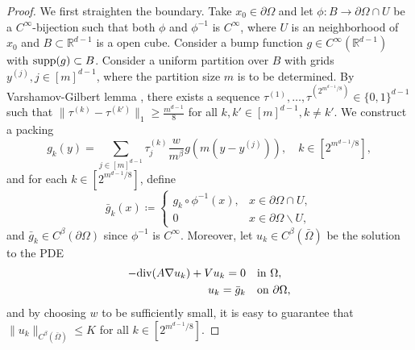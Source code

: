 \documentclass{article}
\newcommand{\R}{\mathbb{R}}
\newcommand{\supp}{\textnormal{supp}}
\renewcommand{\div}{\textnormal{div}}
\theoremstyle{plain}
\theoremstyle{definition}
\theoremstyle{remark}
\begin{document}
\begin{proof}
    We first straighten the boundary. Take $x_0 \in \partial \Omega$ and let $\phi: B \to \partial \Omega \cap U$ be a $C^\infty$-bijection such that both $\phi$ and $\phi^{-1}$ is $C^\infty$, where $U$ is an neighborhood of $x_0$ and $B \subset \R^{d-1}$ is a open cube. Consider a bump function $g \in C^\infty(\R^{d-1})$ with $\supp(g) \subset B$. Consider a uniform partition over $B$ with grids $y^{(j)}, j \in [m]^{d-1}$, where the partition size $m$ is to be determined. By Varshamov-Gilbert lemma \cite{Tsybakov2009}, there exists a sequence $\tau^{(1)}, \ldots, \tau^{(2^{m^{d-1}/8})} \in \{0, 1\}^{d-1}$ such that $\|\tau^{(k)} - \tau^{(k')}\|_1 \geq \frac{m^{d-1}}{8}$ for all $k, k' \in [m]^{d-1}, k \neq k'$. We construct a packing 
    \begin{equation*}
        g_k(y) = \sum_{j \in [m]^{d-1}} \tau_j^{(k)} \frac{w}{m^\beta} g(m(y -y^{(j)})), \quad k \in [2^{m^{d-1}/8}],
    \end{equation*}
    and for each $k \in [2^{m^{d-1}/8}]$, define
    \begin{equation*}
        \bar{g}_k (x) \coloneqq 
        \begin{cases}
            g_k \circ \phi^{-1}(x), & x \in \partial \Omega \cap U,\\
            0 & x \in \partial \Omega \backslash U,
        \end{cases}
    \end{equation*}
    and $\bar{g}_k \in C^\beta(\partial \Omega)$ since $\phi^{-1}$ is $C^\infty$. Moreover, let $u_k \in C^\beta(\bar{\Omega})$ be the solution to the PDE 
    \begin{equation*}
\begin{aligned}
    - \div(A \nabla u_k) + V u_k  = 0  \quad & \textnormal{in} \ \Omega, \\
    u_k = \bar{g}_k \quad & \textnormal{on} \ \partial \Omega,
\end{aligned}
\end{equation*}
and by choosing $w$ to be sufficiently small, it is easy to guarantee that $\|u_k\|_{C^\beta(\bar{\Omega})} \leq K$ for all $k \in [2^{m^{d-1}/8}]$. 


\end{proof}
\end{document}
